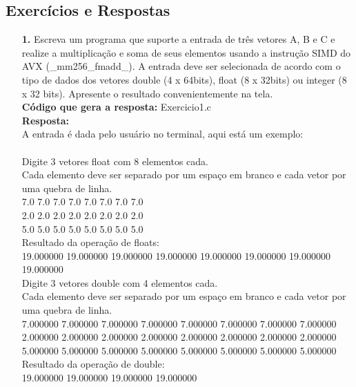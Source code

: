 \documentclass[oneside,a4paper,12pt]{article}
\renewcommand{\b}{\textbf}
\begin{document}
\subsection{Exercícios e Respostas}
\begin{enumerate}
    \item[\b{1.}] Escreva um programa que suporte a entrada de três vetores A, B e C e realize a multiplicação e soma de seus elementos usando a instrução SIMD do AVX (\_mm256\_fmadd\_). A entrada deve ser selecionada de acordo com o tipo de dados dos vetores double (4 x 64bits), float (8 x 32bits) ou integer (8 x 32 bits). Apresente o resultado convenientemente na tela.\\
    
    \b{Código que gera a resposta:} Exercicio1.c\\
    \b{Resposta:}\\
    A entrada é dada pelo usuário no terminal, aqui está um exemplo:\\
    \\
        Digite 3 vetores float com 8 elementos cada.\\
        Cada elemento deve ser separado por um espaço em branco e cada vetor por uma quebra de linha.\\
        7.0 7.0 7.0 7.0 7.0 7.0 7.0 7.0\\
        2.0 2.0 2.0 2.0 2.0 2.0 2.0 2.0\\
        5.0 5.0 5.0 5.0 5.0 5.0 5.0 5.0\\
        Resultado da operação de floats:\\
        19.000000 19.000000 19.000000 19.000000 19.000000 19.000000 19.000000 19.000000\\

        Digite 3 vetores double com 4 elementos cada.\\
        Cada elemento deve ser separado por um espaço em branco e cada vetor por uma quebra de linha.\\
        7.000000 7.000000 7.000000 7.000000 7.000000 7.000000 7.000000 7.000000\\
        2.000000 2.000000 2.000000 2.000000 2.000000 2.000000 2.000000 2.000000\\
        5.000000 5.000000 5.000000 5.000000 5.000000 5.000000 5.000000 5.000000\\
        Resultado da operação de double:\\
        19.000000 19.000000 19.000000 19.000000\\


\end{enumerate}
\end{document}
